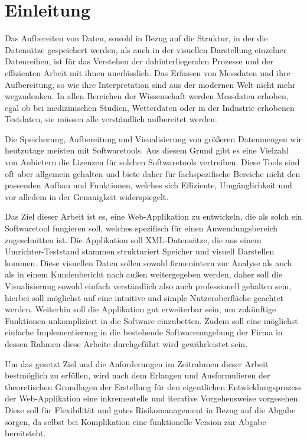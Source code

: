 


\newpage
\section{Einleitung}
\label{Einleitung}
Das Aufbereiten von
Daten, sowohl in Bezug auf die Struktur, in der die Datensätze gespeichert werden,
als auch in der visuellen Darstellung einzelner Datenreihen, ist für das
Verstehen der dahinterliegenden Prozesse und der effizienten Arbeit mit ihnen unerlässlich.
Das Erfassen von Messdaten und ihre Aufbereitung, so wie ihre Interpretation
sind aus der modernen Welt nicht mehr wegzudenken. In allen Bereichen der
Wissenschaft werden Messdaten erhoben, egal ob bei medizinischen Studien,
Wetterdaten oder in der Industrie erhobenen Testdaten, sie müssen alle
verständlich aufbereitet werden.

Die Speicherung,
Aufbereitung und Visualisierung von größeren Datenmengen wir heutzutage meisten
mit Softwaretools. Aus diesem Grund gibt es eine Vielzahl von Anbietern die
Lizenzen für solchen Softwaretools vertreiben. Diese Tools sind oft aber
allgemein gehalten und biete daher für fachspezifische Bereiche nicht den
passenden Aufbau und Funktionen, welches sich Effiziente, Umgänglichkeit und
vor alledem in der Genauigkeit widerspiegelt.

Das Ziel dieser Arbeit
ist es, eine Web-Applikation zu entwickeln, die als solch ein Softwaretool
fungieren soll, welches spezifisch für einen Anwendungsbereich zugeschnitten
ist. Die Applikation soll XML-Datensätze, die aus einem Umrichter-Teststand
stammen strukturiert Speicher und visuell Darstellen kommen. Diese visuellen
Daten sollen sowohl firmenintern zur Analyse als auch als in einem
Kundenbericht nach außen weitergegeben werden, daher soll die Visualisierung sowohl
einfach verständlich also auch professionell gehalten sein, hierbei soll
möglichst auf eine intuitive und simple Nutzeroberfläche geachtet werden.
Weiterhin soll die Applikation gut erweiterbar sein, um zukünftige Funktionen
unkompliziert in die Software einzubetten. Zudem soll eine möglichst einfache
Implementierung in die bestehende Softwareumgebung der Firma in dessen Rahmen
diese Arbeite durchgeführt wird gewährleistet sein.

Um das gesetzt Ziel und
die Anforderungen im Zeitrahmen dieser Arbeit bestmöglich zu erfüllen, wird nach
dem Erlangen und Ausformulieren der theoretischen Grundlagen der Erstellung für
den eigentlichen Entwicklungsprozess der Web-Applikation eine inkrementelle und
iterative Vorgehensweise vorgesehen. Diese soll für Flexibilität und gutes
Risikomanagement in Bezug auf die Abgabe sorgen, da selbst bei Komplikation
eine funktionelle Version zur Abgabe bereitsteht.


